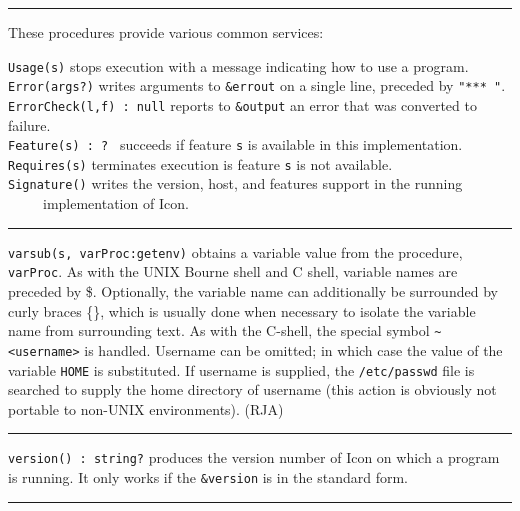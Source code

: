 \vspace{0.25cm}\hrule{}

These procedures provide various common services: 

\texttt{Usage(s)} stops execution with a message
indicating how to use a program.\\
\texttt{Error(args?)} writes arguments to \texttt{\&errout} on a single
line, preceded by \texttt{"*** "}.\\
\texttt{ErrorCheck(l,f) : null} reports to \texttt{\&output} an error
that was converted to failure.\\
\texttt{Feature(s)}\texttt{ : ?} \ succeeds if feature
\texttt{s} is available in this implementation.\\
\texttt{Requires(s)} terminates execution is feature \texttt{s} is not
available.\\
\texttt{Signature()} writes the version, host, and features support in
the running\\
 \ \ \ \ \ implementation of Icon. 

\vspace{0.25cm}\hrule{}

\texttt{varsub(s, varProc:getenv)} obtains a variable value from the
procedure, \texttt{varProc}. As with the UNIX Bourne shell and C shell,
variable names are preceded by \$. Optionally, the variable name can
additionally be surrounded by curly braces \{\}, which is usually done
when necessary to isolate the variable name from surrounding text. As
with the C-shell, the special symbol
\texttt{\~{}{\textless}username{\textgreater}} is handled. Username can
be omitted; in which case the value of the variable \texttt{HOME} is
substituted. If username is supplied, the \texttt{/etc/passwd} file is
searched to supply the home directory of username (this action is
obviously not portable to non-UNIX environments). (RJA)

\vspace{0.25cm}\hrule{}

\texttt{version}\texttt{() : string?} produces the
version number of Icon on which a program is running. It only works if
the \texttt{\&version} is in the standard form. 

\vspace{0.25cm}\hrule{}

